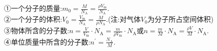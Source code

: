 \begin{enumerate}
\begin{enumerate}
①一个分子的质量:$m _ { 0 } = \frac { M } { N _ { \mathrm { A } } } = \frac { \rho V _ { \mathrm { m } } } { N _ { \mathrm { A } } }$.\\
②一个分子的体积:$V _ { 0 } = \frac { V _ { \mathrm { m } } } { N _ { \mathrm { A } } } = \frac { M } { \rho N _ { \mathrm { A } } }$.(注:对气体$ V_0 $为分子所占空间体积)\\
③物体所含的分子数:$n = \frac { V } { V _ { \mathrm { m } } } \cdot N _ { \mathrm { A } } = \frac { m } { \rho V _ { \mathrm { m } } } \cdot N _ { \mathrm { A } }$或$n = \frac { m } { M } \cdot N _ { \mathrm { A } } = \frac { \rho V } { M } \cdot N _ { \mathrm { A } }$.\\
④单位质量中所含的分子数:$n ^ { \prime } = \frac { N _ { \mathrm { A } } } { M }$.




\end{enumerate}


\end{enumerate}



